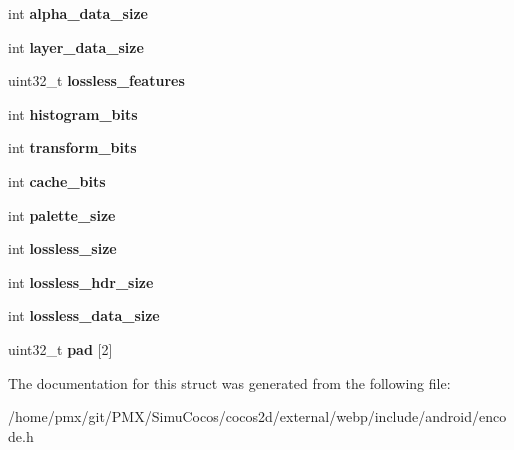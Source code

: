 \begin{DoxyCompactItemize}
int {\bfseries alpha\+\_\+data\+\_\+size}
\item 
\mbox{\label{structWebPAuxStats_a59d8f8889a7f2d68fd02d356f113033d}} 
int {\bfseries layer\+\_\+data\+\_\+size}
\item 
\mbox{\label{structWebPAuxStats_af2ac670c77bae37d4add84b8d7de3dd5}} 
uint32\+\_\+t {\bfseries lossless\+\_\+features}
\item 
\mbox{\label{structWebPAuxStats_a3ae90c934aaaf5c229811598f60f032a}} 
int {\bfseries histogram\+\_\+bits}
\item 
\mbox{\label{structWebPAuxStats_a5bbb98600ce3b08356be01b72b8c3d9c}} 
int {\bfseries transform\+\_\+bits}
\item 
\mbox{\label{structWebPAuxStats_ae00af51edd1e20f2ea547b3d25e664f6}} 
int {\bfseries cache\+\_\+bits}
\item 
\mbox{\label{structWebPAuxStats_aecb02bd799deeee569191f1ed74ffbd6}} 
int {\bfseries palette\+\_\+size}
\item 
\mbox{\label{structWebPAuxStats_a0a00a0cbdefab6980b0da75a4f5f0487}} 
int {\bfseries lossless\+\_\+size}
\item 
\mbox{\label{structWebPAuxStats_a4e84056d2dd69f63421afbcf2891c4b5}} 
int {\bfseries lossless\+\_\+hdr\+\_\+size}
\item 
\mbox{\label{structWebPAuxStats_a55e41718c2104c948f41c56d69144c6f}} 
int {\bfseries lossless\+\_\+data\+\_\+size}
\item 
\mbox{\label{structWebPAuxStats_a7fd633b691364914d4d934a3e7a72c6c}} 
uint32\+\_\+t {\bfseries pad} \mbox{[}2\mbox{]}
\end{DoxyCompactItemize}


The documentation for this struct was generated from the following file\+:\begin{DoxyCompactItemize}
\item 
/home/pmx/git/\+P\+M\+X/\+Simu\+Cocos/cocos2d/external/webp/include/android/encode.\+h\end{DoxyCompactItemize}
